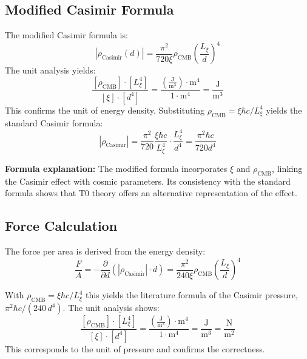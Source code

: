	\subsection{Modified Casimir Formula}
	The modified Casimir formula is:
	\begin{equation}
		|\rho_{\text{Casimir}}(d)| = \frac{\pi^2}{720 \xi} \rho_{\text{CMB}} \left( \frac{L_\xi}{d} \right)^4
	\end{equation}
	The unit analysis yields:
	\begin{equation}
		\frac{[\rho_{\text{CMB}}] \cdot [L_\xi^4]}{[\xi] \cdot [d^4]} = \frac{\left( \frac{\text{J}}{\text{m}^3} \right) \cdot \text{m}^4}{1 \cdot \text{m}^4} = \frac{\text{J}}{\text{m}^3}
	\end{equation}
	This confirms the unit of energy density. Substituting $\rho_{\text{CMB}} = \xi \hbar c / L_\xi^4$ yields the standard Casimir formula:
	\begin{equation}
		|\rho_{\text{Casimir}}| = \frac{\pi^2}{720} \frac{\xi \hbar c}{L_\xi^4} \cdot \frac{L_\xi^4}{d^4} = \frac{\pi^2 \hbar c}{720 d^4}
	\end{equation}
	
	\textbf{Formula explanation:} The modified formula incorporates $\xi$ and $\rho_{\text{CMB}}$, linking the Casimir effect with cosmic parameters. Its consistency with the standard formula shows that T0 theory offers an alternative representation of the effect.
	
	\subsection{Force Calculation}
	The force per area is derived from the energy density:
	\begin{equation}
		\frac{F}{A} = -\frac{\partial}{\partial d} \left( |\rho_{\text{Casimir}}| \cdot d \right) = \frac{\pi^2}{240 \xi} \rho_{\text{CMB}} \left( \frac{L_\xi}{d} \right)^4
	\end{equation}
	
	With $\rho_{\text{CMB}} = \xi\hbar c/L_\xi^4$ this yields the literature formula of the Casimir pressure, $\pi^2\hbar c/(240\,d^4)$.
	The unit analysis shows:
	\begin{equation}
		\frac{[\rho_{\text{CMB}}] \cdot [L_\xi^4]}{[\xi] \cdot [d^4]} = \frac{\left( \frac{\text{J}}{\text{m}^3} \right) \cdot \text{m}^4}{1 \cdot \text{m}^4} = \frac{\text{J}}{\text{m}^3} = \frac{\text{N}}{\text{m}^2}
	\end{equation}
	This corresponds to the unit of pressure and confirms the correctness.
	
